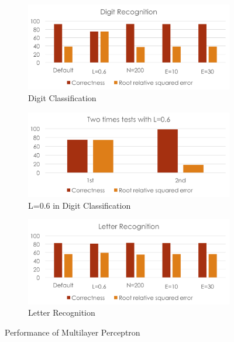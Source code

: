 \documentclass[11pt]{article}
\begin{document}
\begin{figure}[htbp]
\centering

\begin{subfigure}[htbp]{0.46\columnwidth}
\includegraphics*[width=\textwidth]{fig/digit_ANN}
\caption{Digit Classification}
\label{fig:digit-ann}
\end{subfigure}
\hfill
\begin{subfigure}[htbp]{0.46\columnwidth}
\includegraphics*[width=\textwidth]{fig/digit_ANN_special}
\caption{L=0.6 in Digit Classification}
\label{fig:digit-ann-special}
\end{subfigure}
\hfill
\begin{subfigure}[htbp]{0.46\columnwidth}
\includegraphics*[width=\textwidth]{fig/letter_ANN}
\caption{Letter Recognition}
\label{fig:letter-ann}
\end{subfigure}
\caption{Performance of Multilayer Perceptron}
\label{fig:ann}
\end{figure}
\end{document}
